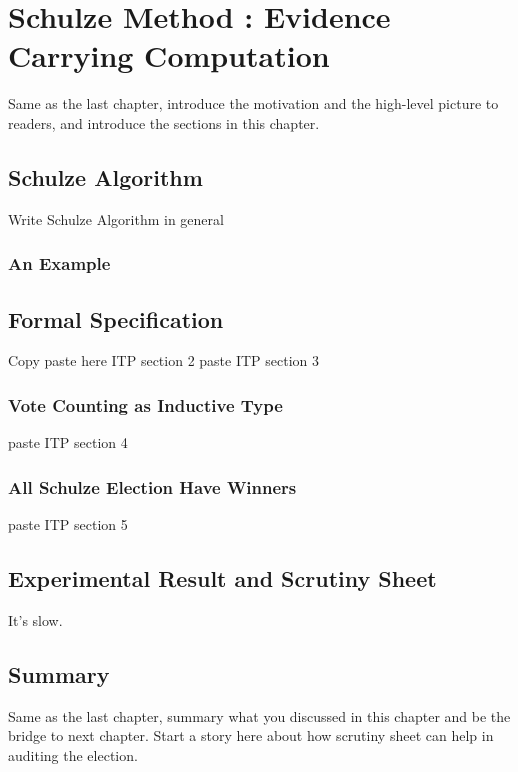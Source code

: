 \chapter{Schulze Method : Evidence Carrying Computation}
\label{cha:schulze_method}
Same as the last chapter, introduce the motivation and the high-level picture to
readers, and introduce the sections in this chapter.


\section{Schulze Algorithm}
	Write Schulze Algorithm in general 
	\subsection{An Example}
	
	
\section{Formal Specification}
	Copy paste here ITP section 2
    		paste ITP section 3
	\subsection{Vote Counting as Inductive Type}
    paste ITP section 4
	\subsection{All Schulze Election Have Winners}
    paste ITP section 5	
\section{Experimental Result and Scrutiny Sheet}
  It's slow.
\section{Summary}
Same as the last chapter, summary what you discussed in this chapter and
be the bridge to next chapter. Start a story here about how scrutiny sheet 
can help in auditing the election.